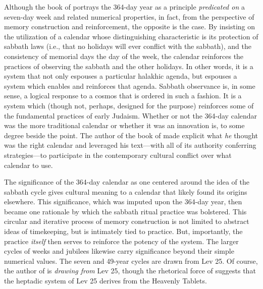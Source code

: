 Although the book of \jub portrays the 364-day year as a principle \emph{predicated on} a seven-day week and related numerical properties, in fact, from the perspective of memory construction and reinforcement, the opposite is the case. By insisting on the utilization of a calendar whose distinguishing characteristic is its protection of sabbath laws (i.e., that no holidays will ever conflict with the sabbath), and the consistency of memorial days \visavis the day of the week, the calendar reinforces the practices of observing the sabbath and the other holidays. In other words, it is a system that not only espouses a particular halakhic agenda, but espouses a system which enables and reinforces that agenda. Sabbath observance is, in some sense, a logical response to a cosmos that is ordered in such a fashion. It is a system which (though not, perhaps, designed for the purpose) reinforces some of the fundamental practices of early Judaism. Whether or not the 364-day calendar was the more traditional calendar or whether it was an innovation is, to some degree beside the point. The author of the book of \jub made explicit what \emph{he} thought was the right calendar and leveraged his text---with all of its authority conferring strategies---to participate in the contemporary cultural conflict over what calendar to use. 

The significance of the 364-day calendar as one centered around the idea of the sabbath cycle gives cultural meaning to a calendar that likely found its origins elsewhere. This significance, which was imputed upon the 364-day year, then became one rationale by which the sabbath ritual practice was bolstered. This circular and iterative process of memory construction is not limited to abstract ideas of timekeeping, but is intimately tied to practice. But, importantly, the practice \emph{itself} then serves to reinforce the potency of the system. 
The larger cycles of weeks and jubilees likewise carry significance beyond their simple numerical values. The seven and 49-year cycles are drawn from Lev 25. Of course, the author of \jub is \emph{drawing from} Lev 25, though the rhetorical force of \jub suggests that the heptadic system of Lev 25 derives from the Heavenly Tablets. 



